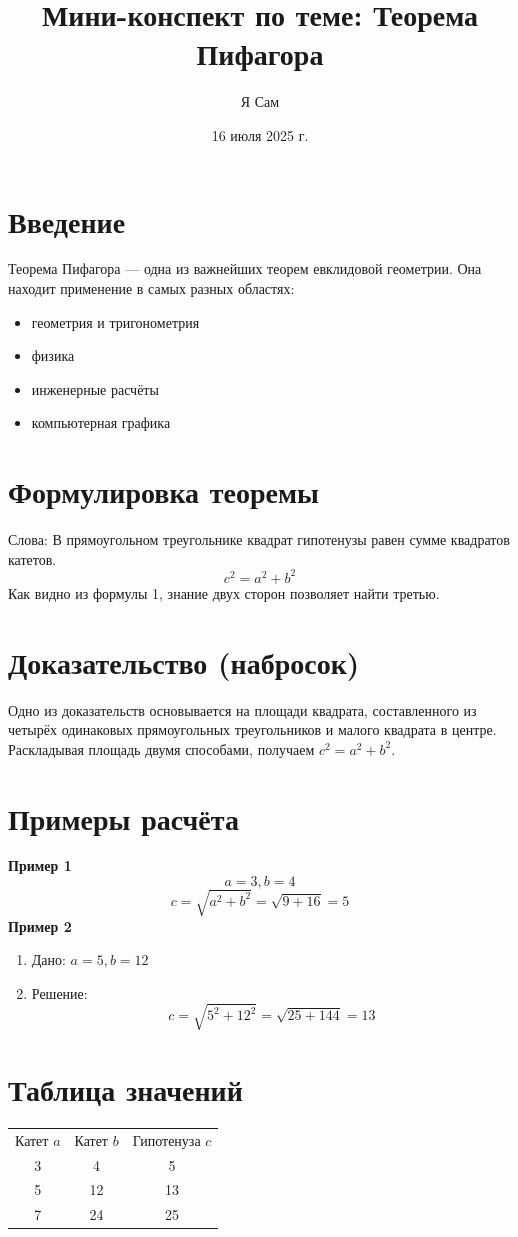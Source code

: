 \documentclass{article}
\title{Мини-конспект по теме: Теорема Пифагора}
\author{Я Сам}
\date{16 июля 2025 г.}
\begin{document}
\maketitle
\tableofcontents
\newpage
\section{Введение}
Теорема Пифагора — одна из важнейших теорем евклидовой геометрии.
Она находит применение в самых разных областях:
\begin{itemize}
\item геометрия и тригонометрия
\item физика
\item инженерные расчёты
\item компьютерная графика
\end{itemize}
\section{Формулировка теоремы}
Слова: В прямоугольном треугольнике квадрат гипотенузы
равен сумме квадратов катетов.
\begin{equation}
c^2 = a^2 + b^2
\end{equation}
Как видно из формулы 1, знание двух сторон позволяет найти третью.
\section{Доказательство (набросок)}
Одно из доказательств основывается на площади квадрата,
составленного из четырёх одинаковых прямоугольных
треугольников и малого квадрата в центре.
Раскладывая площадь двумя способами,
получаем $c^2 = a^2 + b^2$.
\section{Примеры расчёта}
\textbf{Пример 1}
\[
a = 3, b = 4
\]
\[
c = \sqrt{a^2+b^2} = \sqrt{9+16} = 5
\]
\textbf{Пример 2}
\begin{enumerate}
\item Дано: $a = 5, b = 12$
\item Решение:
\[
c = \sqrt{5^2+12^2} = \sqrt{25+144} = 13
\]
\end{enumerate}
\section{Таблица значений}
\begin{center}
\begin{tabular}{ccc}
Катет $a$ & Катет $b$ & Гипотенуза $c$ \\
3 & 4 & 5 \\
5 & 12 & 13 \\
7 & 24 & 25
\end{tabular}
\end{center}
\newpage
\end{document}
